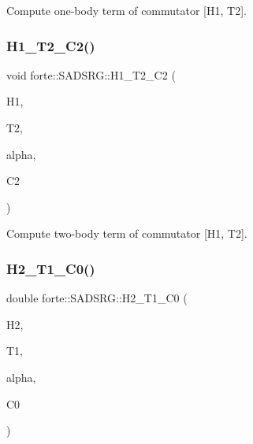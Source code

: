 Compute one-\/body term of commutator \mbox{[}H1, T2\mbox{]}. 

\mbox{\label{classforte_1_1_s_a_d_s_r_g_aaa2c51631d5979f1d7b44a3d6a6d71b6}} 
\subsubsection{\texorpdfstring{H1\+\_\+\+T2\+\_\+\+C2()}{H1\_T2\_C2()}}
{\footnotesize\ttfamily void forte\+::\+S\+A\+D\+S\+R\+G\+::\+H1\+\_\+\+T2\+\_\+\+C2 (\begin{DoxyParamCaption}\item[{Blocked\+Tensor \&}]{H1,  }\item[{Blocked\+Tensor \&}]{T2,  }\item[{const double \&}]{alpha,  }\item[{Blocked\+Tensor \&}]{C2 }\end{DoxyParamCaption})\hspace{0.3cm}{\ttfamily [protected]}}



Compute two-\/body term of commutator \mbox{[}H1, T2\mbox{]}. 

\mbox{\label{classforte_1_1_s_a_d_s_r_g_a6f0151aa9194af398191f64ce3748653}} 
\subsubsection{\texorpdfstring{H2\+\_\+\+T1\+\_\+\+C0()}{H2\_T1\_C0()}}
{\footnotesize\ttfamily double forte\+::\+S\+A\+D\+S\+R\+G\+::\+H2\+\_\+\+T1\+\_\+\+C0 (\begin{DoxyParamCaption}\item[{Blocked\+Tensor \&}]{H2,  }\item[{Blocked\+Tensor \&}]{T1,  }\item[{const double \&}]{alpha,  }\item[{double \&}]{C0 }\end{DoxyParamCaption})\hspace{0.3cm}{\ttfamily [protected]}}



